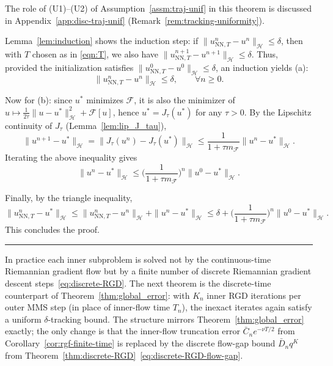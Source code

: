 \documentclass[twoside,11pt]{article}
\newcommand{\BlackBoxProof}{\rule{1.5ex}{1.5ex}}
\renewenvironment{proof}{\par\noindent{\bf Proof\ }}{\hfill\BlackBoxProof\par\medskip}
\newcommand{\rev}[1]{#1}                           %
\newcommand{\calF}{\mathcal{F}}
\newcommand{\calH}{\mathcal{H}}
\begin{document}
The role of (U1)--(U2) of Assumption~\ref{assm:traj-unif} in this theorem is discussed in Appendix~\ref{app:disc-traj-unif} (Remark~\ref{rem:tracking-uniformity}).

\begin{proof}
Lemma~\ref{lem:induction} shows the induction step:
if $\|u_{\mathrm{NN},T}^n-u^n\|_\calH\le\delta$, then with $T$ chosen as in \eqref{eqn:T},
we also have $\|u_{\mathrm{NN},T}^{n+1}-u^{n+1}\|_\calH\le\delta$.
Thus, provided the initialization satisfies $\|u_{\mathrm{NN},T}^0-u^0\|_\calH\le\delta$, an induction yields (a): 
\[
\|u_{\mathrm{NN},T}^n-u^n\|_\calH\le\delta,\qquad \forall n\ge0.
\]


Now for (b): since $u^*$ minimizes $\calF$, it is also the minimizer of
$u\mapsto \frac1{2\tau}\|u-u^*\|_\calH^2+\calF[u]$, hence $u^*=J_\tau(u^*)$ for any $\tau >0$.
By the Lipschitz continuity of $J_\tau$ (Lemma~\ref{lem:lip_J_tau}),
\[
\|u^{n+1}-u^*\|_\calH
=\|J_\tau(u^n)-J_\tau(u^*)\|_\calH
\le \frac{1}{1+\tau m_\calF}\|u^n-u^*\|_\calH.
\]
Iterating the above inequality gives
\[
\|u^{n}-u^*\|_\calH\le \Big(\frac{1}{1+\tau m_\calF}\Big)^n\|u^0-u^*\|_\calH .
\]


Finally, by the triangle inequality,
\[
\|u_{\mathrm{NN},T}^n-u^*\|_\calH
\le \|u_{\mathrm{NN},T}^n-u^n\|_\calH + \|u^n-u^*\|_\calH
\le \delta + \Big(\frac{1}{1+\tau m_\calF}\Big)^n\|u^0-u^*\|_\calH.
\]
This concludes the proof.
\end{proof}

\rev{%
In practice each inner subproblem is solved not by the continuous-time Riemannian gradient flow but by a finite number of discrete Riemannian gradient descent steps~\eqref{eq:discrete-RGD}. The next theorem is the discrete-time counterpart of Theorem~\ref{thm:global_error}: with $K_n$ inner RGD iterations per outer MMS step (in place of inner-flow time $T_n$), the inexact iterates again satisfy a uniform $\delta$-tracking bound. The structure mirrors Theorem~\ref{thm:global_error} exactly; the only change is that the inner-flow truncation error $\bar C_n e^{-\nu T/2}$ from Corollary~\ref{cor:rgf-finite-time} is replaced by the discrete flow-gap bound $\bar D_n q^{K}$ from Theorem~\ref{thm:discrete-RGD}~\eqref{eq:discrete-RGD-flow-gap}.
}
\end{document}
